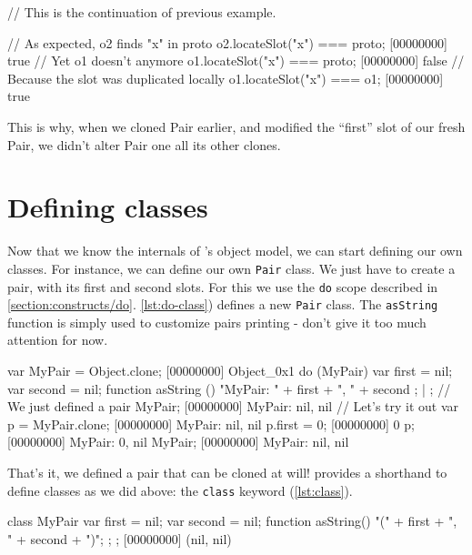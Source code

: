 \begin{urbiscript}[caption=Inspecting copy on write,
  label=lst:check-copy-on-write, name=cow]
// This is the continuation of previous example.

// As expected, o2 finds "x" in proto
o2.locateSlot("x") === proto;
[00000000] true
// Yet o1 doesn't anymore
o1.locateSlot("x") === proto;
[00000000] false
// Because the slot was duplicated locally
o1.locateSlot("x") === o1;
[00000000] true
\end{urbiscript}

This is why, when we cloned Pair earlier, and modified the ``first''
slot of our fresh Pair, we didn't alter Pair one all its other clones.

\section{Defining classes}

Now that we know the internals of \urbi's object model, we can start
defining our own classes. For instance, we can define our own
\texttt{Pair} class. We just have to create a pair, with its first and
second slots. For this we use the \texttt{do} scope described in
\autoref{section:constructs/do}. \autoref{lst:do-class}) defines a new
\texttt{Pair} class. The \texttt{asString} function is simply used to
customize pairs printing - don't give it too much attention for now.

\begin{urbiscript}[caption=Defining our own \texttt{MyPair} class,
  label=lst:do-class]
var MyPair = Object.clone;
[00000000] Object_0x1
do (MyPair)
{
  var first = nil;
  var second = nil;
  function asString ()
  {
    "MyPair: " + first + ", " + second
  };
} | {};
// We just defined a pair
MyPair;
[00000000] MyPair: nil, nil
// Let's try it out
var p = MyPair.clone;
[00000000] MyPair: nil, nil
p.first = 0;
[00000000] 0
p;
[00000000] MyPair: 0, nil
MyPair;
[00000000] MyPair: nil, nil
\end{urbiscript}

That's it, we defined a pair that can be cloned at will! \urbi
provides a shorthand to define classes as we did above: the
\texttt{class} keyword (\autoref{lst:class}).

\begin{urbiscript}[caption=Using the \texttt{class} construct,
  label=lst:class, name=my-pair]
class MyPair
{
  var first = nil;
  var second = nil;
  function asString() { "(" + first + ", " + second + ")"; };
};
[00000000] (nil, nil)
\end{urbiscript}

